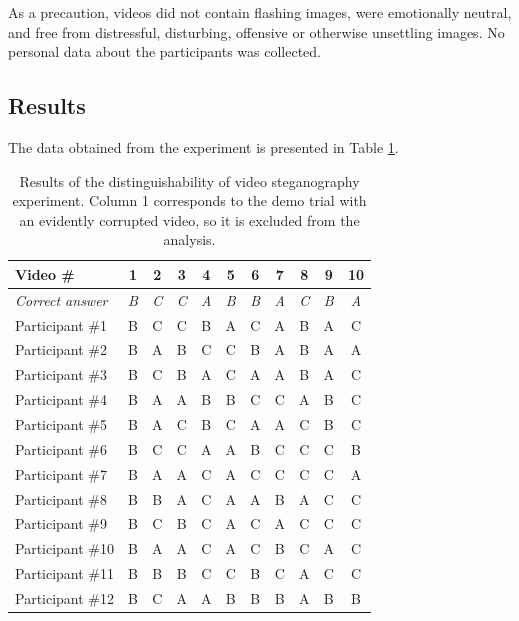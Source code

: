 \documentclass[12pt,british,twoside,notitlepage,usenames,dvipsnames,hypens,final]{report}
\numberwithin{equation}{section}
\numberwithin{figure}{section}
\begin{document}
As a precaution, videos did not contain flashing images, were emotionally neutral, and free from distressful, disturbing, offensive or otherwise unsettling images. No personal data about the participants was collected.

\subsection{Results}

The data obtained from the experiment is presented in Table \ref{tbl:detect-exp-res}. 

\begin{table}[tbh]
\centering
\bgroup
\def\arraystretch{1.3}
\begin{tabular}{|l|c|c|c|c|c|c|c|c|c|c|}
\hline
\textbf{Video \#} & \textbf{1} & \textbf{2} & \textbf{3} & \textbf{4} & \textbf{5} & \textbf{6} & \textbf{7} & \textbf{8} & \textbf{9} & \textbf{10}\\
\hline
\textit{Correct answer} & \textit{B} & \textit{C} & \textit{C} & \textit{A} & \textit{B} & \textit{B} & \textit{A} & \textit{C} & \textit{B} & \textit{A}\\
\hline
Participant \#1  & B & C & C & B & A & C & A & B & A & C \\
Participant \#2  & B & A & B & C & C & B & A & B & A & A \\
Participant \#3  & B & C & B & A & C & A & A & B & A & C \\
Participant \#4  & B & A & A & B & B & C & C & A & B & C \\
Participant \#5  & B & A & C & B & C & A & A & C & B & C \\
Participant \#6  & B & C & C & A & A & B & C & C & C & B \\
Participant \#7  & B & A & A & C & A & C & C & C & C & A \\
Participant \#8  & B & B & A & C & A & A & B & A & C & C \\
Participant \#9  & B & C & B & C & A & C & A & C & C & C \\
Participant \#10 & B & A & A & C & A & C & B & C & A & C \\
Participant \#11 & B & B & B & C & C & B & C & A & C & C \\
Participant \#12 & B & C & A & A & B & B & B & A & B & B \\
\hline
\end{tabular}
\egroup
\caption{Results of the distinguishability of video steganography experiment. Column 1 corresponds to the demo trial with an evidently corrupted video, so it is excluded from the analysis.}
\label{tbl:detect-exp-res}
\end{table}
\end{document}
